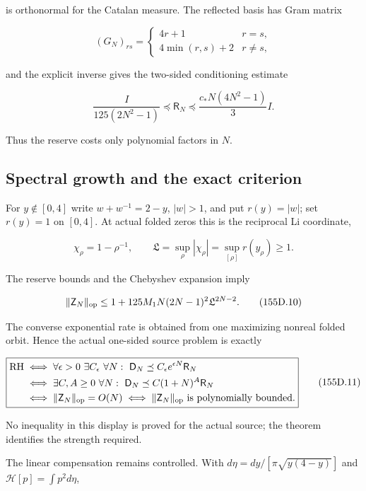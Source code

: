 \documentclass[
  11pt,
]{book}
\begin{document}
is orthonormal for the Catalan measure. The reflected basis has Gram
matrix

\[
(G_N)_{rs}=\begin{cases}4r+1&r=s,\\4\min(r,s)+2&r\ne s,
\end{cases}
\tag{155D.5}
\]

and the explicit inverse gives the two-sided conditioning estimate

\[
\boxed{\frac{I}{125(2N^2-1)}\preceq\mathsf R_N
\preceq\frac{c_*N(4N^2-1)}3I.}
\tag{155D.6}
\]

Thus the reserve costs only polynomial factors in \(N\).

\subsection{Spectral growth and the exact
criterion}\label{spectral-growth-and-the-exact-criterion}

For \(y\notin[0,4]\) write \(w+w^{-1}=2-y\), \(|w|>1\), and put
\(r(y)=|w|\); set \(r(y)=1\) on \([0,4]\). At actual folded zeros this
is the reciprocal Li coordinate,

\[
\chi_\rho=1-\rho^{-1},\qquad
\mathfrak L=\sup_\rho|\chi_\rho|=\sup_{[\rho]}r(y_\rho)\ge1.
\tag{155D.8}
\]

The reserve bounds and the Chebyshev expansion imply

\[
\|\mathsf Z_N\|_{\rm op}
\le1+125M_1N(2N-1)^2\mathfrak L^{2N-2}.
\tag{155D.10}
\]

The converse exponential rate is obtained from one maximizing nonreal
folded orbit. Hence the actual one-sided source problem is exactly

\[
\boxed{\begin{aligned}
\mathrm{RH}&\iff
\forall\epsilon>0\ \exists C_\epsilon\ \forall N:\
\mathsf D_N\preceq C_\epsilon e^{\epsilon N}\mathsf R_N\\
&\iff\exists C,A\ge0\ \forall N:\
\mathsf D_N\preceq C(1+N)^A\mathsf R_N\\
&\iff\|\mathsf Z_N\|_{\rm op}=O(N)
\iff\|\mathsf Z_N\|_{\rm op}\text{ is polynomially bounded}.
\end{aligned}}
\tag{155D.11}
\]

No inequality in this display is proved for the actual source; the
theorem identifies the strength required.

The linear compensation remains controlled. With
\(d\eta=dy/[\pi\sqrt{y(4-y)}]\) and \(\mathcal H[p]=\int p^2d\eta\),
\end{document}
